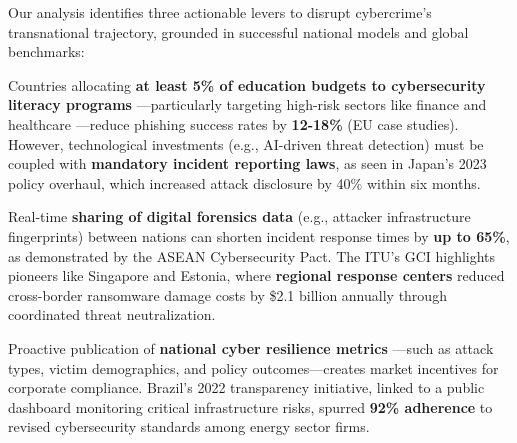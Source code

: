 Our analysis identifies three actionable levers to disrupt cybercrime's transnational trajectory,
grounded in successful national models and global benchmarks:

Countries allocating \textbf{at least 5\% of education budgets to cybersecurity literacy programs}
—particularly targeting high-risk sectors like finance and healthcare
—reduce phishing success rates by \textbf{12-18\%} (EU case studies).
However, technological investments (e.g., AI-driven threat detection)
must be coupled with \textbf{mandatory incident reporting laws},
as seen in Japan’s 2023 policy overhaul, which increased attack disclosure by 40\% within six months.

Real-time \textbf{sharing of digital forensics data} (e.g., attacker infrastructure fingerprints)
between nations can shorten incident response times by \textbf{up to 65\%},
as demonstrated by the ASEAN Cybersecurity Pact.
The ITU’s GCI highlights pioneers like Singapore and Estonia,
where \textbf{regional response centers} reduced cross-border ransomware damage
costs by \$2.1 billion annually through coordinated threat neutralization.

Proactive publication of \textbf{national cyber resilience metrics}
—such as attack types, victim demographics, and policy outcomes—creates market incentives for corporate compliance.
Brazil’s 2022 transparency initiative, linked to a public dashboard monitoring critical infrastructure risks,
spurred \textbf{92\% adherence} to revised cybersecurity standards among energy sector firms.
